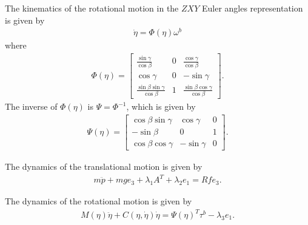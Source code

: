 The kinematics of the rotational motion in the $ZXY$ Euler angles representation is given by
\begin{align}
    \label{eq:kinematic_of_rotation_with_constraint_simplified_ver}
\dot{\eta} = \Phi(\eta) \omega^b
\end{align}
where
\begin{align*}
    \Phi(\eta) = 
    \begin{bmatrix}
        \frac{\sin \gamma}{\cos \beta} & 0 & \frac{\cos \gamma}{\cos \beta}\\
        \cos \gamma & 0 & - \sin \gamma\\
        \frac{\sin \beta \sin \gamma}{\cos \beta} & 1 & \frac{\sin \beta \cos \gamma}{\cos \beta}
    \end{bmatrix}.
\end{align*}
The inverse of $ \Phi(\eta) $ is $ \Psi = \Phi^{-1} $, which is given by
\begin{align}
    \label{eq:definition_of_Psi}
    \Psi(\eta) =
    \begin{bmatrix}
        \cos \beta \sin \gamma & \cos \gamma & 0 \\
        - \sin \beta & 0 & 1 \\
        \cos \beta \cos \gamma & - \sin \gamma & 0
    \end{bmatrix}.
\end{align}

The dynamics of the translational motion is given by
\begin{align}
	\label{eq:translational_dynamics}
	m\ddot{p}+mge_3 +\lambda_1 A^T +\lambda_2 e_1 = Rfe_3.
\end{align}

The dynamics of the rotational motion \cite{nonami_autonomous_2010} is given by
\begin{align}
    \label{eq:rotational_el_eq}
    M(\eta) \ddot{\eta} + C(\eta, \dot{\eta}) \dot{\eta} = \Psi(\eta)^T \tau^b - \lambda_3 e_1.
\end{align}


